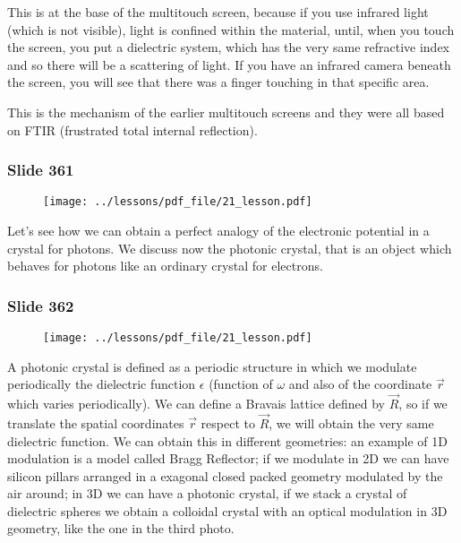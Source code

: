 \documentclass[../main/main.tex]{subfiles}
\begin{document}
This is at the base of the multitouch screen, because if you use infrared light (which is not visible), light is confined within the material, until, when you touch the screen, you put a dielectric system, which has the very same refractive index and so there will be a scattering of light.
If you have an infrared camera beneath the screen, you will see that there was a finger touching in that specific area.

This is the mechanism of the earlier multitouch screens and they were all based on FTIR (frustrated total internal reflection).

\newpage

\subsubsection{Slide 361}

\begin{figure}[h!]
\centering
\texttt{[image: ../lessons/pdf\_file/21\_lesson.pdf]}
\end{figure}

Let's see how we can obtain a perfect analogy of the electronic potential in a crystal for photons.
We discuss now the photonic crystal, that is an object which behaves for photons like an ordinary crystal for electrons.


\newpage

\subsubsection{Slide 362}

\begin{figure}[h!]
\centering
\texttt{[image: ../lessons/pdf\_file/21\_lesson.pdf]}
\end{figure}

A photonic crystal is defined as a periodic structure in which we modulate periodically the dielectric function $\epsilon$ (function of $\omega$ and also of the coordinate $\vec{r}$ which varies periodically).
We can define a Bravais lattice defined by $\vec{R}$, so if we translate the spatial coordinates $\vec{r}$ respect to $\vec{R}$, we will obtain the very same dielectric function.
We can obtain this in different geometries: an example of 1D modulation is a model called Bragg Reflector; if we modulate in 2D we can have silicon pillars arranged in a exagonal closed packed geometry modulated by the air around; in 3D we can have a photonic crystal, if we stack a crystal of dielectric spheres we obtain a colloidal crystal with an optical modulation in 3D geometry, like the one in the third photo. 
\end{document}
